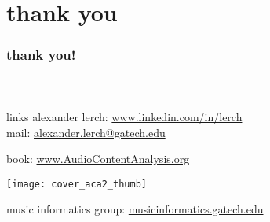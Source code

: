 \section[thanks]{thank you}

  \begin{frame}\frametitle{thank you!}\framesubtitle{~}
        
        \begin{block}{links}
            alexander lerch: \href{https://www.linkedin.com/in/lerch}{www.linkedin.com/in/lerch}\\             
            
            \bigskip
            mail: \href{mailto:alexander.lerch@gatech.edu}{alexander.lerch@gatech.edu}

            \bigskip                
            book: \href{https://www.AudioContentAnalysis.org}{www.AudioContentAnalysis.org}
            
            \vspace{-25mm}
            \begin{flushright}
                \texttt{[image: cover\_aca2\_thumb]}
            \end{flushright}
            \vspace{-15mm}


            \bigskip
            music informatics group:
            \href{http://musicinformatics.gatech.edu}{musicinformatics.gatech.edu}
                            
            \vspace{5mm}

        \end{block}
        
        
    \end{frame}
